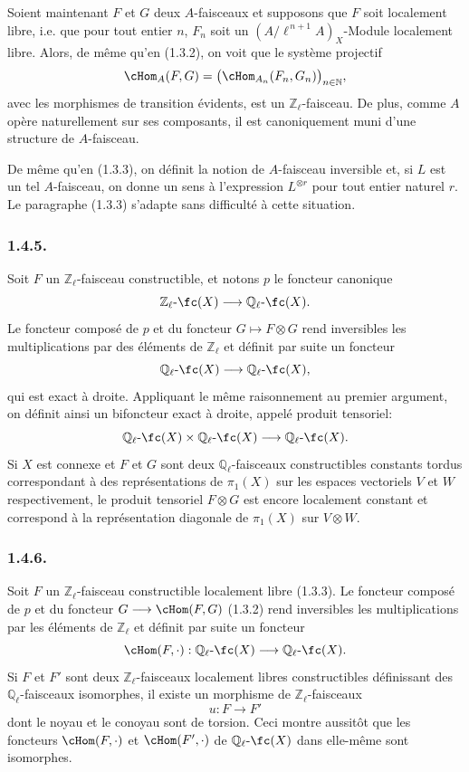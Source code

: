 Soient maintenant \(F\) et \(G\) deux \(A\)-faisceaux et supposons que \(F\) soit localement libre, i.e. que pour tout entier \(n\), \(F_n\) soit un \((A/\ell^{\,n+1}A)_X\)-Module localement libre. Alors, de même qu'en (1.3.2), on
voit que le système projectif
\[
\cHom_A(F,G)=\bigl(\cHom_{A_n}(F_n,G_n)\bigr)_{n\in\mathbb{N}},
\]
avec les morphismes de transition évidents, est un \(\mathbb{Z}_\ell\)-faisceau. De plus, comme \(A\) opère naturellement sur ses composants, il est canoniquement muni d'une structure de \(A\)-faisceau.

De même qu'en (1.3.3), on définit la notion de \(A\)-faisceau inversible et, si \(L\) est un tel \(A\)-faisceau, on donne un sens à l'expression \(L^{\otimes r}\) pour tout entier naturel \(r\). Le paragraphe (1.3.3) s'adapte sans difficulté à cette situation.

\subsubsection*{1.4.5.}
Soit \(F\) un \(\mathbb{Z}_\ell\)-faisceau constructible, et notons \(p\) le foncteur canonique
\[
\mathbb{Z}_\ell\text{-}\fc(X)\longrightarrow \mathbb{Q}_\ell\text{-}\fc(X).
\]
Le foncteur composé de \(p\) et du foncteur \(G\mapsto F\otimes G\) rend inversibles les multiplications par des éléments de \(\mathbb{Z}_\ell\) et définit par suite un foncteur
\[
\mathbb{Q}_\ell\text{-}\fc(X)\longrightarrow \mathbb{Q}_\ell\text{-}\fc(X),
\]
qui est exact à droite. Appliquant le même raisonnement au premier argument, on définit ainsi un bifoncteur exact à droite, appelé produit tensoriel:
\[
\mathbb{Q}_\ell\text{-}\fc(X)\times \mathbb{Q}_\ell\text{-}\fc(X)
\longrightarrow \mathbb{Q}_\ell\text{-}\fc(X).
\]
Si \(X\) est connexe et \(F\) et \(G\) sont deux \(\mathbb{Q}_\ell\)-faisceaux constructibles constants tordus correspondant à des représentations de \(\pi_1(X)\) sur les espaces vectoriels \(V\) et \(W\) respectivement, le produit tensoriel \(F\otimes G\) est encore localement constant et correspond à la représentation diagonale de \(\pi_1(X)\) sur \(V\otimes W\).

\subsubsection*{1.4.6.}
Soit \(F\) un \(\mathbb{Z}_\ell\)-faisceau constructible localement libre (1.3.3). Le foncteur composé de \(p\) et du foncteur \(G\longrightarrow\cHom(F,G)\) (1.3.2) rend inversibles les multiplications par les éléments de \(\mathbb{Z}_\ell\) et définit par suite un foncteur
\[
\cHom(F,\cdot):\mathbb{Q}_\ell\text{-}\fc(X)\longrightarrow \mathbb{Q}_\ell\text{-}\fc(X).
\]
Si \(F\) et \(F'\) sont deux \(\mathbb{Z}_\ell\)-faisceaux localement libres constructibles définissant des \(\mathbb{Q}_\ell\)-faisceaux isomorphes, il existe un morphisme de \(\mathbb{Z}_\ell\)-faisceaux
\[
u:F\longrightarrow F'
\]
dont le noyau et le conoyau sont de torsion. Ceci montre aussitôt que les foncteurs \(\cHom(F,\cdot)\) et \(\cHom(F',\cdot)\) de \(\mathbb{Q}_\ell\text{-}\fc(X)\) dans elle-même sont isomorphes.

